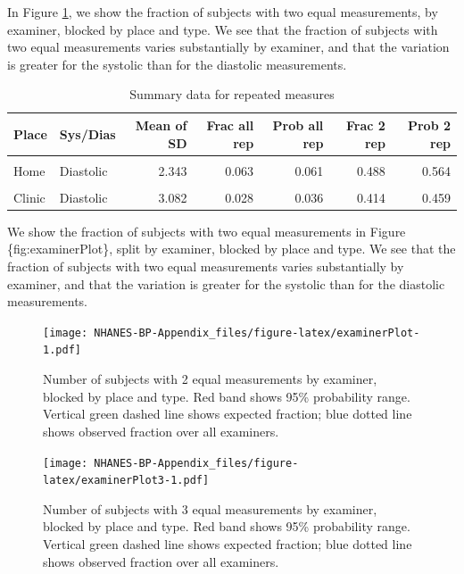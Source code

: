 \documentclass[
]{article}
\begin{document}
In Figure \ref{fig:examinerPlot}, we show the fraction of subjects with two equal measurements, by examiner, blocked by place and type.
We see that the fraction of subjects with two equal measurements varies substantially by examiner, and that the variation is greater for the systolic than for the diastolic measurements.

\begin{table}[!h]
\centering
\caption{\label{tab:sd-summary}Summary data for repeated measures}
\centering
\begin{tabular}[t]{llrrrrr}
\toprule
Place & Sys/Dias & Mean of SD & Frac all rep & Prob all rep & Frac 2 rep & Prob 2 rep\\
\midrule
\cellcolor{gray!10}{Home} & \cellcolor{gray!10}{Systolic} & \cellcolor{gray!10}{2.739} & \cellcolor{gray!10}{0.050} & \cellcolor{gray!10}{0.048} & \cellcolor{gray!10}{0.432} & \cellcolor{gray!10}{0.510}\\
Home & Diastolic & 2.343 & 0.063 & 0.061 & 0.488 & 0.564\\
\cellcolor{gray!10}{Clinic} & \cellcolor{gray!10}{Systolic} & \cellcolor{gray!10}{3.775} & \cellcolor{gray!10}{0.024} & \cellcolor{gray!10}{0.028} & \cellcolor{gray!10}{0.355} & \cellcolor{gray!10}{0.400}\\
Clinic & Diastolic & 3.082 & 0.028 & 0.036 & 0.414 & 0.459\\
\bottomrule
\end{tabular}
\end{table}

We show the fraction of subjects with two equal measurements in Figure \{fig:examinerPlot\}, split by examiner, blocked by place and type.
We see that the fraction of subjects with two equal measurements varies substantially by examiner, and that the variation is greater for the systolic than for the diastolic measurements.

\begin{figure}
\centering
\texttt{[image: NHANES-BP-Appendix\_files/figure-latex/examinerPlot-1.pdf]}
\caption{\label{fig:examinerPlot}Number of subjects with 2 equal measurements by examiner, blocked by place and type. Red band shows 95\% probability range. Vertical green dashed line shows expected fraction; blue dotted line shows observed fraction over all examiners.}
\end{figure}

\begin{figure}
\centering
\texttt{[image: NHANES-BP-Appendix\_files/figure-latex/examinerPlot3-1.pdf]}
\caption{\label{fig:examinerPlot3}Number of subjects with 3 equal measurements by examiner, blocked by place and type. Red band shows 95\% probability range. Vertical green dashed line shows expected fraction; blue dotted line shows observed fraction over all examiners.}
\end{figure}
\end{document}
